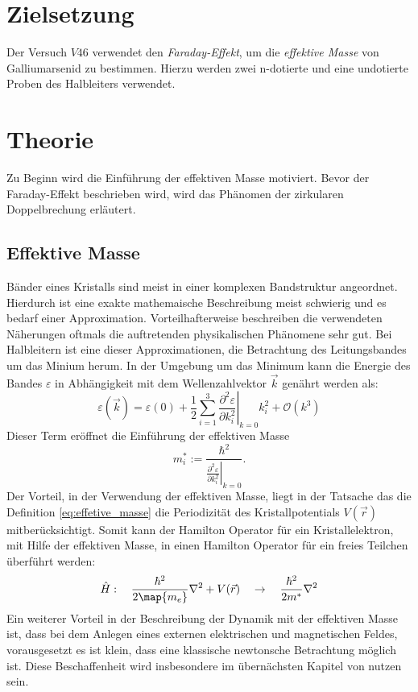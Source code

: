\setcounter{page}{1}
\section*{Zielsetzung}
Der Versuch $V46$ verwendet den \emph{Faraday-Effekt}, um die \emph{effektive Masse} von
Galliumarsenid zu bestimmen. Hierzu werden zwei n-dotierte und eine undotierte
Proben des Halbleiters verwendet.
\section{Theorie}
Zu Beginn wird die Einführung der effektiven Masse motiviert.
Bevor der Faraday-Effekt beschrieben wird, wird das Phänomen der zirkularen
Doppelbrechung erläutert.
\subsection{Effektive Masse}\label{sec:effektive_masse}
Bänder eines Kristalls sind meist in einer komplexen Bandstruktur angeordnet.
Hierdurch ist eine exakte mathemaische Beschreibung meist schwierig und es bedarf
einer Approximation. Vorteilhafterweise beschreiben die verwendeten Näherungen oftmals
die auftretenden physikalischen Phänomene sehr gut. Bei Halbleitern ist eine
dieser Approximationen, die Betrachtung des Leitungsbandes um das Minium herum.
In der Umgebung um das Minimum kann die Energie des Bandes $\varepsilon$
in Abhängigkeit mit dem Wellenzahlvektor $\vec{k}$ genährt werden als:
\begin{equation}
  \label{eq:gleichung_energie}
  \varepsilon(\vec{k})=\varepsilon(0) + \frac{1}{2}\sum_{i=1}^3 \left.\frac{\partial^2 \varepsilon}{\partial k_i^2}\right|_{k=0}k_i^2 + \mathcal{O}(k^3)
\end{equation}
Dieser Term eröffnet die Einführung der effektiven Masse
\begin{equation}
  \label{eq:effetive_masse}
  m^{*}_i := \frac{\hbar^2}{\left.\frac{\partial^2 \varepsilon}{\partial k_i^2}\right|_{k=0}}.
\end{equation}
Der Vorteil, in der Verwendung der effektiven Masse, liegt in der Tatsache das
die Definition \eqref{eq:effetive_masse} die Periodizität des Kristallpotentials
$V(\vec{r})$ mitberücksichtigt. Somit kann der Hamilton Operator für ein Kristallelektron,
mit Hilfe der effektiven Masse, in einen Hamilton Operator für ein freies
Teilchen überführt werden:
\begin{equation*}
  \hat{H}:\quad \frac{\hbar^2}{2\map{m_e}}\nabla^2 + V(\vec{r}) \quad \rightarrow \quad   \frac{\hbar^2}{2m^*}\nabla^2
\end{equation*}
Ein weiterer Vorteil in der Beschreibung der Dynamik mit der effektiven Masse ist,
dass bei dem Anlegen eines externen elektrischen und magnetischen Feldes,
vorausgesetzt es ist klein, dass eine klassische newtonsche Betrachtung möglich ist.
Diese Beschaffenheit wird insbesondere im übernächsten Kapitel von nutzen sein.

